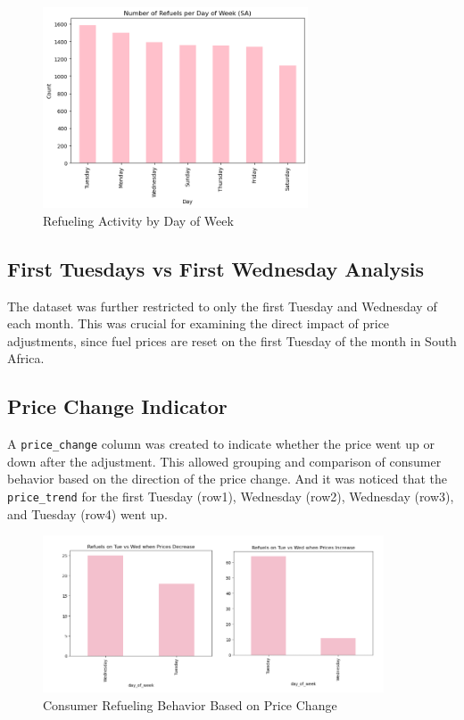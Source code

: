 \documentclass{article}
\begin{document}
\begin{figure}[h]
    \centering
    \includegraphics[width=0.7\textwidth]{images/Number of refuels.png}
    \caption{Refueling Activity by Day of Week}
\end{figure}

\subsection*{First Tuesdays vs First Wednesday Analysis}
The dataset was further restricted to only the first Tuesday and Wednesday of each month. This was crucial for examining the direct impact of price adjustments, since fuel prices are reset on the first Tuesday of the month in South Africa.

\subsection*{Price Change Indicator}
A \texttt{price\_change} column was created to indicate whether the price went up or down after the adjustment. This allowed grouping and comparison of consumer behavior based on the direction of the price change. And it was noticed that the \texttt{price\_trend} for the first Tuesday (row1), Wednesday (row2), Wednesday (row3), and Tuesday (row4) went up.

\begin{figure}[h]
    \centering
    \includegraphics[width=0.9\textwidth]{images/Screenshot 2025-09-07 222047.png}
    \caption{Consumer Refueling Behavior Based on Price Change}
\end{figure}
\end{document}
